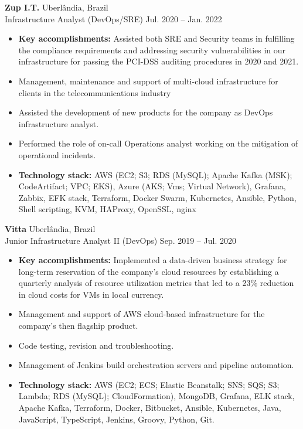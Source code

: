 \documentclass[12pt]{article}
\newcommand{\entry}[4]{{{\textbf{#1}}} \hfill #3 \\ #2 \hfill #4}
\begin{document}
\begin{paracol}{2}
\medskip

\entry{Zup I.T.}{Infrastructure Analyst (DevOps/SRE)}{Uberlândia, Brazil}{Jul. 2020 -- Jan. 2022}
\begin{itemize}[noitemsep,leftmargin=3.5mm,rightmargin=0mm,topsep=6pt]
  \item \textbf{Key accomplishments:} Assisted both SRE and Security teams in fulfilling the compliance requirements and addressing security vulnerabilities in our infrastructure for passing the PCI-DSS auditing procedures in 2020 and 2021.
  \item Management, maintenance and support of multi-cloud
  infrastructure for clients in the telecommunications industry
  \item Assisted the development of new products for the company as DevOps
  infrastructure analyst.
  \item Performed the role of on-call Operations analyst working on the mitigation
  of operational incidents.
  \item \textbf{Technology stack:} AWS (EC2; S3; RDS (MySQL); Apache Kafka
  (MSK); CodeArtifact; VPC; EKS), Azure (AKS;
  Vms; Virtual Network), Grafana, Zabbix, EFK
  stack, Terraform, Docker Swarm, Kubernetes, Ansible, Python, Shell scripting,
  KVM, HAProxy, OpenSSL, nginx
\end{itemize}

\medskip

\entry{Vitta}{Junior Infrastructure Analyst II (DevOps)}{Uberlândia, Brazil}{Sep. 2019 -- Jul. 2020}
\begin{itemize}[noitemsep,leftmargin=3.5mm,rightmargin=0mm,topsep=6pt]
  \item \textbf{Key accomplishments:} Implemented a data-driven business strategy for long-term reservation of the company's cloud resources by establishing a quarterly analysis of resource utilization metrics that led to a 23\% reduction in cloud costs for VMs in local currency.
  \item Management and support of AWS cloud-based infrastructure for the company’s then flagship product.
  \item Code testing, revision and troubleshooting.
  \item Management of Jenkins build orchestration servers and pipeline automation.
  \item \textbf{Technology stack:} AWS (EC2; ECS; Elastic Beanstalk; SNS; SQS; S3;
  Lambda; RDS (MySQL); CloudFormation), MongoDB, Grafana, ELK stack, Apache Kafka,
  Terraform, Docker, Bitbucket, Ansible, Kubernetes, Java, JavaScript, TypeScript,
  Jenkins, Groovy, Python, Git.
\end{itemize}


\end{paracol}
\end{document}
